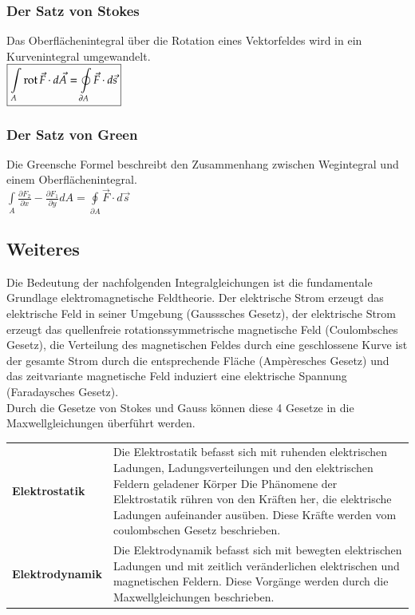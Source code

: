 \subsubsection{Der Satz von Stokes}
Das Oberflächenintegral über die Rotation eines Vektorfeldes wird in ein Kurvenintegral umgewandelt. \\
$\boxed{\int\limits_A \operatorname{rot} \vec{F}\cdot d\vec{A}  = \oint\limits_{\partial A}\vec{F}\cdot d\vec{s}}$
\subsubsection{Der Satz von Green}
Die Greensche Formel beschreibt den Zusammenhang zwischen Wegintegral und einem Oberflächenintegral.\\
$\boxed{\int\limits_A \frac{\partial F_2}{\partial x} - \frac{\partial F_1}{\partial y} dA = \oint\limits_{\partial A}\vec{F}\cdot d\vec{s}}$
\subsection{Weiteres}
Die Bedeutung der nachfolgenden Integralgleichungen ist die fundamentale Grundlage elektromagnetische Feldtheorie. Der elektrische Strom erzeugt das elektrische Feld in seiner Umgebung (Gausssches Gesetz), der elektrische Strom erzeugt das quellenfreie rotationssymmetrische magnetische Feld (Coulombsches Gesetz), die Verteilung des magnetischen Feldes durch eine geschlossene Kurve ist der gesamte Strom durch die entsprechende Fläche (Ampèresches Gesetz) und das zeitvariante magnetische Feld induziert eine elektrische Spannung (Faradaysches Gesetz).\\
Durch die Gesetze von Stokes und Gauss können diese 4 Gesetze in die Maxwellgleichungen überführt werden. 
\vspace{-0.8cm}
\begin{longtable}{p{} p{}}
	\textbf{Elektrostatik} & Die Elektrostatik befasst sich mit ruhenden elektrischen Ladungen, Ladungsverteilungen und den elektrischen Feldern geladener Körper
	Die Phänomene der Elektrostatik rühren von den Kräften her, die elektrische Ladungen aufeinander ausüben. Diese Kräfte werden vom coulombschen Gesetz beschrieben.\\
	\textbf{Elektrodynamik} & Die Elektrodynamik befasst sich mit bewegten elektrischen Ladungen und mit zeitlich veränderlichen elektrischen und magnetischen Feldern. Diese Vorgänge werden durch die Maxwellgleichungen beschrieben. \\
\end{longtable}
